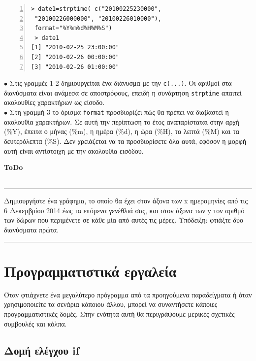 \documentclass[a4paper,10pt,twocolumn]{article}
\newenvironment{ToDo} {
  \begin{flushright}
    \hfill
    \begin{minipage}{0.9\columnwidth}
    \textsf{\textbf{ToDo}} \\
      \vspace{-0.7cm}\\
      {\color{Gray}\rule[-0.05cm]{\columnwidth}{1.5pt}}} {
      {\color{Gray}\rule[0.3cm]{\columnwidth}{1.5pt}}
    \end{minipage}
    \vspace{0.3cm}
  \end{flushright}
  }
\begin{document}
\begin{Verbatim}[frame=single,numbers=left,gobble=0, xleftmargin=0.35cm, numbersep=0.1cm]
> date1=strptime( c("20100225230000", 
 "20100226000000", "20100226010000"), 
 format="%Y%m%d%H%M%S")
 > date1
[1] "2010-02-25 23:00:00" 
[2] "2010-02-26 00:00:00" 
[3] "2010-02-26 01:00:00"
\end{Verbatim}

\noindent $\bullet$  Στις γραμμές 1-2 δημιουργείται ένα διάνυσμα με την \texttt{c(...)}. Οι αριθμοί στα 
διανύσματα είναι ανάμεσα σε αποστρόφους, επειδή η συνάρτηση \texttt{strptime} απαιτεί ακολουθίες χαρακτήρων ως
είσοδο.\\
\noindent $\bullet$ Στη γραμμή 3 το όρισμα \texttt{format} προσδιορίζει πώς θα πρέπει να διαβαστεί η ακολουθία
χαρακτήρων. Σε αυτή την περίπτωση το έτος αναπαρίσταται στην αρχή (\%Y), έπειτα ο μήνας (\%m), η ημέρα (\%d),
η ώρα (\%H), τα λεπτά (\%M) και τα δευτερόλεπτα (\%S). Δεν χρειάζεται να τα προσδιορίσετε όλα αυτά, εφόσον η
μορφή αυτή είναι αντίστοιχη με την ακολουθία εισόδου.

\begin{ToDo}
Δημιουργήστε ένα γράφημα, το οποίο θα έχει στον άξονα των x ημερομηνίες από τις 6 Δεκεμβρίου 2014 έως τα επόμενα 
γενέθλιά σας, και στον άξονα των y τον αριθμό των δώρων που περιμένετε σε κάθε μία από αυτές τις μέρες.
Υπόδειξη: φτιάξτε δύο διανύσματα πρώτα.
\end{ToDo}


\section{Προγραμματιστικά εργαλεία}

Όταν φτιάχνετε ένα μεγαλύτερο πρόγραμμα από τα προηγούμενα παραδείγματα ή όταν χρησιμοποιείτε τα σενάρια κάποιου
άλλου, μπορεί να συναντήσετε κάποιες προγραμματιστικές δομές. Στην ενότητα αυτή θα περιγράψουμε μερικές
σχετικές συμβουλές και κόλπα.

\subsection{Δομή ελέγχου if}
\end{document}
